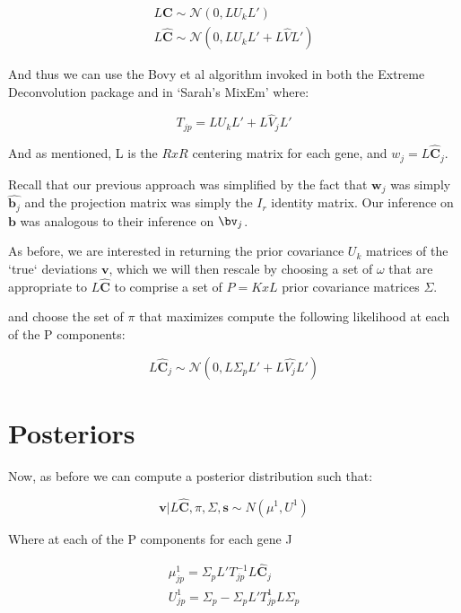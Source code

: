 \documentclass[11pt, oneside]{article}   	%
\newcommand{\Norm}{{\mathcal{N}}} %
\newcommand{\ceff}{\bm{C}}
\newcommand{\chat}{\bm{\hat{C}}}
\newcommand{\vb}{\bm{v}}
\def\L{L}
\begin{document}
\begin{itemize}
\begin{equation}
\begin{aligned}
\label{maxlike}
L \ceff \sim \Norm (0, L U_{k} L') \\
L \chat \sim \Norm (0, L U_{k} L' + L\hat{V} L') 
\end{aligned}
\end{equation}

And thus we can use the Bovy et al algorithm invoked in both the Extreme Deconvolution package and in `Sarah's MixEm' where:

\begin{equation}
 T_{jp} = L U_k L' + L\hat{V}_{j} L'
\end{equation}

And as mentioned, L is the $RxR$ centering matrix for each gene, and $w_{j} = L \chat_{j}$.

Recall that our previous approach was simplified by the fact that $\bm{w}_{j}$ was simply $\hat{\bm{b}_{j}}$ and the projection matrix was simply the $I_{r}$ identity matrix. Our inference on $\bm{b}$ was analogous to their inference on $\bv_{j}$. 


As before, we are interested in returning the prior covariance $U_k$ matrices of the `true` deviations $\vb$, which we will then rescale by choosing a set of $\omega$ that are appropriate to $L \chat $ to comprise a set of $P = KxL$ prior covariance matrices $\Sigma$.

and choose the set of $\pi$ that maximizes compute the following likelihood at each of the P components: 

\begin{equation}
L \chat _j \sim \Norm (0, L \Sigma_{p} L' + L\hat{V_j} L') 
\end{equation}
 

\section{Posteriors}

Now, as before we can compute a posterior distribution such that:

\begin{equation}
\vb | \L \chat, \pi, \Sigma, \bm{s} \sim N(\mu^{1} , U^{1})
\end{equation}

Where at each of the P components for each gene J 

\begin{equation}
\begin{aligned}
\mu^{1}_{jp} = \Sigma_{p} L' T_{jp}^{-1} L \chat_{j} \\
U^{1}_{jp} = \Sigma_{p} - \Sigma_p L' T_{jp}^{1} L \Sigma_{p}
\end{aligned}
\end{equation}



\end{itemize}
\end{document}
